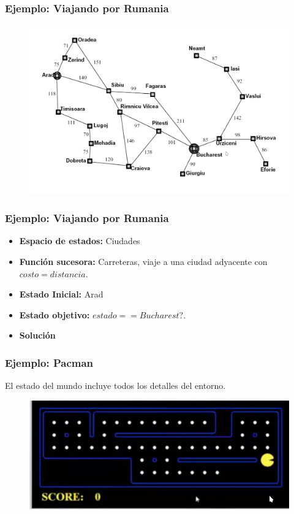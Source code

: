 \documentclass[10pt]{beamer}
\begin{document}
\begin{frame}
  \frametitle{Ejemplo: Viajando por Rumania}

  \begin{figure}[!h] 
    \centering
    \includegraphics[width=\textwidth]{img/rumania}
  \end{figure} 
  
\end{frame}

\begin{frame}
  \frametitle{Ejemplo: Viajando por Rumania}

\begin{itemize}
  \item \textbf{Espacio de estados:} Ciudades
  \item \textbf{Función sucesora:} Carreteras, viaje a una ciudad adyacente con $costo=distancia$.
  \item \textbf{Estado Inicial:} Arad
  \item \textbf{Estado objetivo:} $estado == Bucharest?$.
  \item \textbf{Solución}
\end{itemize}
  
\end{frame}

\begin{frame}
  \frametitle{Ejemplo: Pacman}

  El estado del mundo incluye todos los detalles del entorno. 
  \begin{figure}[!h] 
    \centering
    \includegraphics[width=\textwidth]{img/pacman2}
  \end{figure} 
  
\end{frame}
\end{document}

